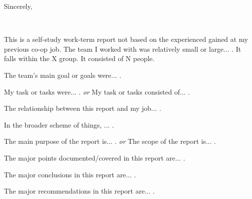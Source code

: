 \documentclass{ece}
\begin{document}
Sincerely,
\vspace*{6\baselineskip}

\printauthorname\\
\printstudentnumber


\contributions

This is a self-study work-term report not based on the experienced gained at my previous co-op job.  The team I worked with was relatively small or large... .  It falls within the X group.  It consisted of N people.

The team's main goal or goals were... .

My task or tasks were... .  \emph{or}  My task or tasks consisted of... .

The relationship between this report and my job... .

In the broader scheme of things, ... .


\summary

The main purpose of the report is... .  \emph{or}  The scope of the report is... .

The major points documented/covered in this report are... .

The major conclusions in this report are... .

The major recommendations in this report are... .


\end{document}
